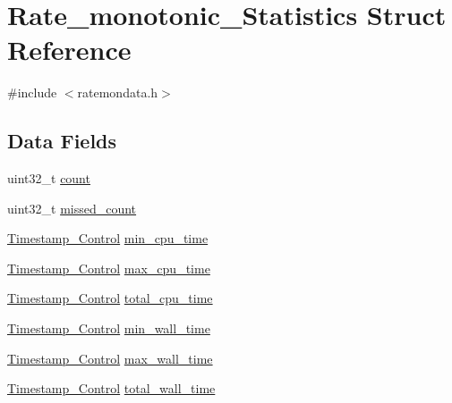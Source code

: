 \hypertarget{structRate__monotonic__Statistics}{}\section{Rate\+\_\+monotonic\+\_\+\+Statistics Struct Reference}
\label{structRate__monotonic__Statistics}


{\ttfamily \#include $<$ratemondata.\+h$>$}

\subsection*{Data Fields}
\begin{DoxyCompactItemize}
\item 
uint32\+\_\+t \mbox{\hyperlink{structRate__monotonic__Statistics_a7d4623fdb41c60413bb4063473f0fc0c}{count}}
\item 
uint32\+\_\+t \mbox{\hyperlink{structRate__monotonic__Statistics_accc34b6b08db85277bce12d76e2f3901}{missed\+\_\+count}}
\item 
\mbox{\hyperlink{group__SuperCoreTimeStamp_ga8508036506d5211c98844c88045e2410}{Timestamp\+\_\+\+Control}} \mbox{\hyperlink{structRate__monotonic__Statistics_a48656f389f03862d2afeacef29e4a75e}{min\+\_\+cpu\+\_\+time}}
\item 
\mbox{\hyperlink{group__SuperCoreTimeStamp_ga8508036506d5211c98844c88045e2410}{Timestamp\+\_\+\+Control}} \mbox{\hyperlink{structRate__monotonic__Statistics_a4b047a93ec678358536a11dd17052368}{max\+\_\+cpu\+\_\+time}}
\item 
\mbox{\hyperlink{group__SuperCoreTimeStamp_ga8508036506d5211c98844c88045e2410}{Timestamp\+\_\+\+Control}} \mbox{\hyperlink{structRate__monotonic__Statistics_a7be6d44096a9a1655d7188019d0647e0}{total\+\_\+cpu\+\_\+time}}
\item 
\mbox{\hyperlink{group__SuperCoreTimeStamp_ga8508036506d5211c98844c88045e2410}{Timestamp\+\_\+\+Control}} \mbox{\hyperlink{structRate__monotonic__Statistics_a0c5190e19ccf5c761d3e8436547911ce}{min\+\_\+wall\+\_\+time}}
\item 
\mbox{\hyperlink{group__SuperCoreTimeStamp_ga8508036506d5211c98844c88045e2410}{Timestamp\+\_\+\+Control}} \mbox{\hyperlink{structRate__monotonic__Statistics_ad3b1b97d97a5279a02d98b23dd829f90}{max\+\_\+wall\+\_\+time}}
\item 
\mbox{\hyperlink{group__SuperCoreTimeStamp_ga8508036506d5211c98844c88045e2410}{Timestamp\+\_\+\+Control}} \mbox{\hyperlink{structRate__monotonic__Statistics_af0238631b7deae9488d8dc0f4959a9eb}{total\+\_\+wall\+\_\+time}}
\end{DoxyCompactItemize}


